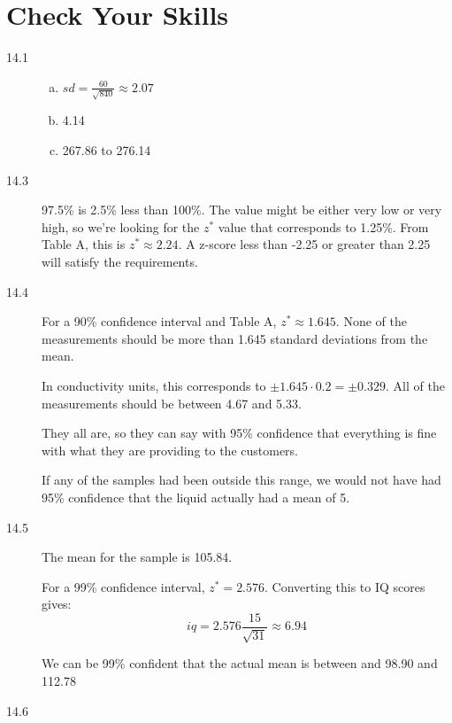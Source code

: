 \documentclass[landscape]{exam}
\begin{document}
  \section{Check Your Skills}
  \begin{description}
    \item[14.1] 
      \begin{enumerate}[(a)]

        \item $ sd = \frac{60}{\sqrt{840}} \approx \boxed{ 2.07 } $

        \item 4.14

        \item 267.86 to 276.14

      \end{enumerate}

    \item[14.3] 97.5\% is 2.5\% less than 100\%. The value might be either very low
      or very high, so we're looking for the $z^*$ value that corresponds to
      1.25\%. From Table A, this is $z^* \approx 2.24$. A z-score less than
      -2.25 or greater than 2.25 will satisfy the requirements.

    \item[14.4]
      For a 90\% confidence interval and Table A, $z^* \approx 1.645$. None of
      the measurements should be more than 1.645 standard deviations from the
      mean.

      In conductivity units, this corresponds to $\pm 1.645 \cdot 0.2 = \pm
      0.329$. All of the measurements should be between 4.67 and 5.33.

      They all are, so they can say with 95\% confidence that everything is
      fine with what they are providing to the customers.

      If any of the samples had been outside this range, we would not have had
      95\% confidence that the liquid actually had a mean of 5.

    \item[14.5]
      The mean for the sample is 105.84. 

      For a 99\% confidence interval, $z^* = 2.576$. Converting this to IQ
      scores gives:
      \[
        iq = 2.576 \frac{15}{\sqrt{31}} \approx 6.94
      \]

      We can be 99\% confident that the actual mean is between and 98.90 and 112.78

    \item[14.6]


\end{description}
\end{document}
